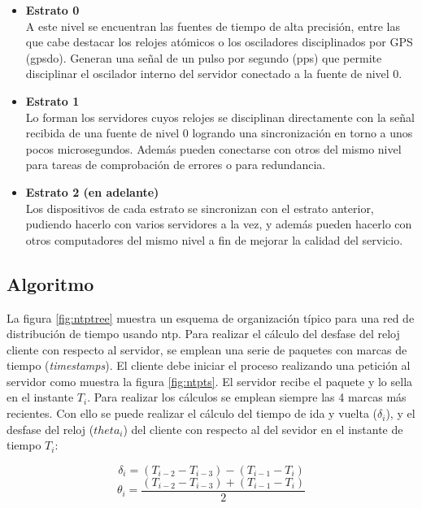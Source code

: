 \begin{itemize}
	\item \textbf{Estrato 0} \\ A este nivel se encuentran las fuentes de 
	tiempo de alta precisión, entre las que cabe destacar los relojes atómicos 
	o los osciladores disciplinados por GPS (\acrshort{gpsdo}). Generan una 
	señal de un pulso por segundo (\acrshort{pps}) que permite disciplinar el 
	oscilador interno del servidor conectado a la fuente de nivel 0.
	
	\item \textbf{Estrato 1} \\ Lo forman los servidores cuyos relojes se 
	disciplinan directamente con la señal recibida de una fuente de nivel 0 
	logrando una sincronización en torno a unos pocos microsegundos. Además 
	pueden conectarse con otros del mismo nivel para tareas de comprobación de 
	errores o para redundancia.
	
	\item \textbf{Estrato 2 (en adelante)} \\ Los dispositivos de cada estrato 
	se 
	sincronizan con el estrato anterior, pudiendo hacerlo con varios servidores 
	a la vez, y además pueden hacerlo con otros computadores del mismo nivel a 
	fin de mejorar la calidad del servicio.
\end{itemize}

\subsection{Algoritmo}

La figura \ref{fig:ntptree} muestra un esquema de organización típico para una 
red de distribución de tiempo usando \gls{ntp}. Para realizar el cálculo del 
desfase del reloj cliente con respecto al servidor, se emplean una serie de 
paquetes con marcas de tiempo (\textit{timestamps}). El cliente debe iniciar el 
proceso realizando una petición al servidor como muestra la figura 
\ref{fig:ntpts}. El servidor recibe el paquete y lo sella en el instante $T_i$. 
Para realizar los cálculos se emplean siempre las 4 marcas más recientes. Con 
ello se puede realizar el cálculo del tiempo de ida y vuelta ($\delta_i$), y el 
desfase del reloj ($theta_i$) del cliente con respecto al del sevidor en el 
instante de tiempo $T_i$:

\begin{equation}\label{ntprtt}
	\delta_i = (T_{i-2}-T_{i-3}) - (T_{i-1}-T_{i})
\end{equation}\label{ntpoffset}
\begin{equation}
	\theta_i = \frac{(T_{i-2}-T_{i-3}) + (T_{i-1}-T_{i})} {2}
\end{equation}

